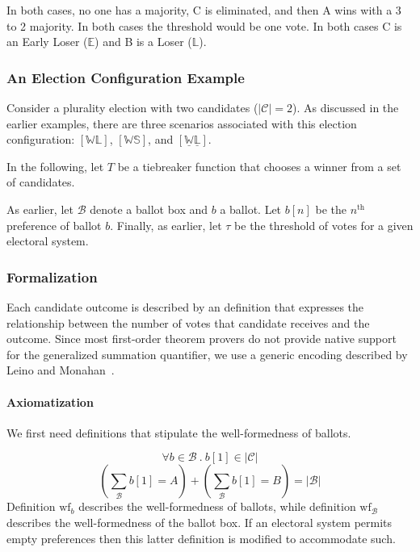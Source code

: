 \documentclass[runningheads,a4paper]{llncs}
\newcommand{\ballots}{\ensuremath{\mathcal{B}}\xspace}
\newcommand{\candidates}{\ensuremath{\mathcal{C}}\xspace}
\newcommand{\winner}{\ensuremath{\mathbb{W}}}
\newcommand{\earlyloser}{\ensuremath{\mathbb{E}}}
\newcommand{\loser}{\ensuremath{\mathbb{L}}}
\newcommand{\belowthreshold}{\ensuremath{\mathbb{S}}}
\newcommand{\tiebreak}[1]{\ensuremath{\underline{#1}}}
\begin{document}
In both cases, no one has a majority, C is eliminated, and then A wins
with a 3 to 2 majority.   In both cases the threshold would be one
vote.  In both cases C is an Early Loser (\earlyloser) \xspace and B is
a Loser (\loser).

\subsubsection{An Election Configuration Example}

Consider a plurality election with two candidates ($|\candidates| =
2$).  As discussed in the earlier examples, there are three scenarios
associated with this election configuration: $[\winner \loser]$,
$[\winner\belowthreshold]$, and
$[\tiebreak{\winner}\tiebreak{\loser}]$.

In the following, let $T$ be a tiebreaker function that chooses a
winner from a set of candidates.

As earlier, let \ballots denote a ballot box and $b$ a ballot.  Let
$b[n]$ be the $n^{\text{th}}$ preference of ballot $b$.  Finally, as
earlier, let $\tau$ be the threshold of votes for a given electoral
system.

\subsubsection{Formalization}

Each candidate outcome is described by an definition that expresses the
relationship between the number of votes that candidate receives and
the outcome.  Since most first-order theorem provers do not provide
native support for the generalized summation quantifier, we use a
generic encoding described by Leino and Monahan~\cite{LeinoMonahan09}.

\paragraph*{Axiomatization}

We first need definitions that stipulate the well-formedness of ballots.

\begin{equation*}
  {\forall b \in \ballots\ .\ b[1] \in |\candidates|}
\end{equation*}
\begin{equation*}
  {(\sum_\ballots{b[1] = A}) + (\sum_\ballots{b[1] = B}) = |\ballots|}
\end{equation*}
Definition $\text{wf}_b$ describes the well-formedness of ballots, while
definition $\text{wf}_\ballots$ describes the well-formedness of the ballot
box.  If an electoral system permits empty preferences then this
latter definition is modified to accommodate such.
\end{document}
